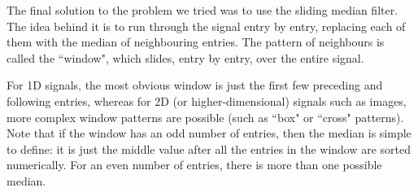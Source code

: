 The final solution to the problem we tried was to use the sliding median filter. The idea behind it is to run through the signal entry by entry, replacing each of them with the median of neighbouring entries. The pattern of neighbours is called the ``window", which slides, entry by entry, over the entire signal. 

For 1D signals, the most obvious window is just the first few preceding and following entries, whereas for 2D (or higher-dimensional) signals such as images, more complex window patterns are possible (such as ``box" or ``cross" patterns). Note that if the window has an odd number of entries, then the median is simple to define: it is just the middle value after all the entries in the window are sorted numerically. For an even number of entries, there is more than one possible median.

